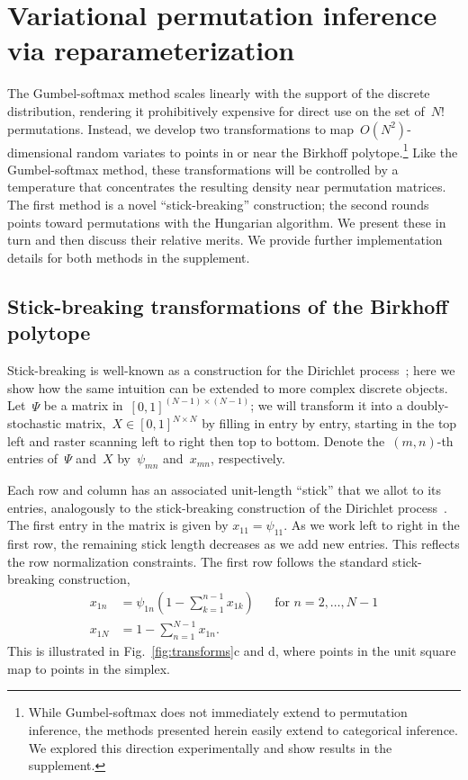 \documentclass[twoside]{article}
\begin{document}
\section{Variational permutation inference via reparameterization}
\label{sec:permutation}
The Gumbel-softmax method scales linearly with the support of the
discrete distribution, rendering it prohibitively expensive for direct
use on the set of~$N!$ permutations.  Instead, we develop two
transformations to map~$O(N^2)$-dimensional random variates to points
in or near the Birkhoff polytope.\footnote{While Gumbel-softmax does
  not immediately extend to permutation inference, the methods
  presented herein easily extend to categorical inference.  We
  explored this direction experimentally and show results in the
  supplement.}  Like the Gumbel-softmax method, these transformations
will be controlled by a temperature that concentrates the resulting
density near permutation matrices.  The first method is a novel
``stick-breaking'' construction; the second rounds points toward
permutations with the Hungarian algorithm.  We present these in turn
and then discuss their relative merits. We provide further
implementation details for both methods in the supplement.

\subsection{Stick-breaking transformations of the Birkhoff polytope}
Stick-breaking is well-known as a construction for the Dirichlet
process~\citep{sethuraman1994constructive}; here we show how the
same intuition can be extended to more complex discrete objects. 
Let~$\Psi$ be a matrix in~${[0,1]^{(N-1) \times (N-1)}}$; we will
transform it into a doubly-stochastic
matrix,~${X \in [0,1]^{N \times N}}$ by filling in entry by entry, starting
in the top left and raster scanning left to right then top to
bottom. Denote the~$(m,n)$-th entries of~$\Psi$ and~$X$ by~$\psi_{mn}$
and~${x}_{mn}$, respectively.

Each row and column has an associated unit-length ``stick'' that we
allot to its entries, analogously to the stick-breaking construction
of the Dirichlet process~\citep{sethuraman1994constructive}.  The
first entry in the matrix is given by $x_{11} = \psi_{11}$.  As we
work left to right in the first row, the remaining stick length
decreases as we add new entries. This reflects the row normalization
constraints.  The first row follows the standard stick-breaking
construction,
\begin{align*}
  x_{1n} &= \psi_{1n} \left(1 - \sum_{k=1}^{n-1} x_{1k} \right)  & &  \text{for } n=2, \ldots, N-1\\
  x_{1N} &= 1 - \sum_{n=1}^{N-1} x_{1n}.
\end{align*}
This is illustrated in Fig.~\ref{fig:transforms}c and d, where points
in the unit square map to points in the simplex. 
\end{document}
